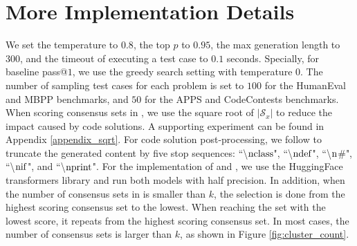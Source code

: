 \appendix

\section{More Implementation Details}
\label{sec:appendix_detail}
We set the temperature to $0.8$, the top $p$ to $0.95$, the max generation length to $300$, and the timeout of executing a test case to $0.1$ seconds. Specially, for baseline pass@$1$, we use the greedy search setting with temperature $0$. The number of sampling test cases for each problem is set to $100$ for the HumanEval and MBPP benchmarks, and $50$ for the APPS and CodeContests benchmarks. When scoring consensus sets in \ours, we use the square root of $|\mathcal{S}_x|$ to reduce the impact caused by code solutions. A supporting experiment can be found in Appendix \ref{appendix_sqrt}. For code solution post-processing, we follow \cite{chen2021evaluating} to truncate the generated content by five stop sequences: ``\textbackslash${\rm nclass}$", ``\textbackslash${\rm ndef}$", ``\textbackslash ${\rm n}$\#", ``\textbackslash${\rm nif}$", and ``\textbackslash${\rm nprint}$".  
For the implementation of \incoder and \codegen, 
we use the HuggingFace transformers library \citep{Wolf2019HuggingFacesTS} and run both models with half precision.  
In addition, when the number of consensus sets in \ours is smaller than $k$, the selection is done from the highest scoring consensus set to the lowest. When reaching the set with the lowest score, it repeats from the highest scoring consensus set. In most cases, the number of consensus sets is larger than $k$, as shown in Figure \ref{fig:cluster_count}.

